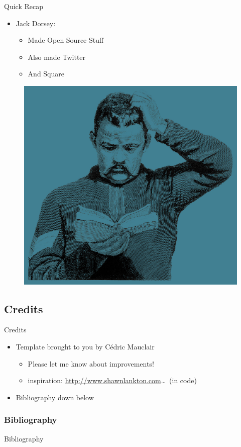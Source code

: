 \documentclass[xcolor=svgnames,handout]{beamer}
\begin{document}
\begin{frame}{Quick Recap}
	\begin{itemize}
		\item Jack Dorsey:
			\begin{itemize}
				\item Made Open Source Stuff
				\item Also made Twitter
				\item And Square
			\end{itemize}
	\end{itemize}
	\begin{figure}[h]
		\centering
		\includegraphics[scale=0.10]{review.jpg}
		\caption{\cite{jamesarboghast20009}}
	\end{figure}
\end{frame}


\subsection{Credits}
\begin{frame}{Credits}
	\begin{itemize}
		\item Template brought to you by Cédric Mauclair
			\begin{itemize}
				\item Please let me know about improvements!
				\item inspiration: \url{http://www.shawnlankton.com}\ldots{}~(in code)
			\end{itemize} 
		\item Bibliography down below
	\end{itemize}
\end{frame}

\subsubsection{Bibliography}
\begin{frame}[allowframebreaks]{Bibliography}
	\printbibliography{}
\end{frame}
\end{document}
